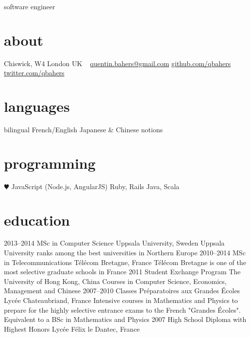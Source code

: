 \documentclass[]{friggeri-cv}
\begin{document}
       {software engineer}


\begin{aside}
  \section{about}
    Chiswick, W4
    London
    UK
    ~
    \href{mailto:quentin.bahers@gmail.com}{quentin.bahers@gmail.com}
    \href{http://github.com/qbahers}{github.com/qbahers}
    \href{http://twitter.com/qbahers}{twitter.com/qbahers}
  \section{languages}
    bilingual French/English
    Japanese \& Chinese notions
  \section{programming}
    {\color{red} $\varheartsuit$} JavaScript
    (Node.js, AngularJS)
    Ruby, Rails
    Java, Scala
\end{aside}



\section{education}

\begin{entrylist}
  \entry
    {2013–2014}
    {MSc in Computer Science}
    {Uppsala University, Sweden}
    {Uppsala University ranks among the best universities in Northern Europe}
  \entry
    {2010–2014}
    {MSc in Telecommunications}
    {Télécom Bretagne, France}
    {Télécom Bretagne is one of the most selective graduate schools in France}
  \entry
    {2011}
    {Student Exchange Program}
    {The University of Hong Kong, China}
    {Courses in Computer Science, Economics, Management and Chinese}
  \entry
    {2007–2010}
    {Classes Préparatoires aux Grandes Écoles}
    {Lycée Chateaubriand, France}
    {Intensive courses in Mathematics and Physics to prepare for the highly selective entrance exams to the French "Grandes Écoles".
    \\ Equivalent to a BSc in Mathematics and Physics}
  \entry
    {2007}
    {High School Diploma with Highest Honors}
    {Lycée Félix le Dantec, France}
    {}
\end{entrylist}
\end{document}
